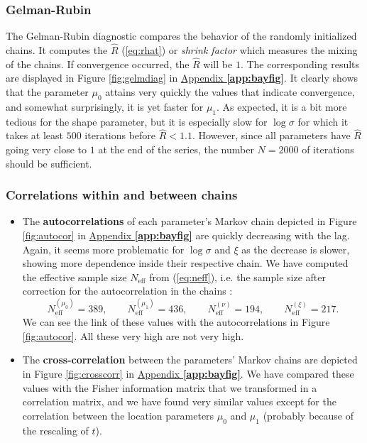 \subsubsection*{Gelman-Rubin}

The Gelman-Rubin diagnostic compares the behavior of the randomly initialized chains. It computes the $\hat{R}$ (\ref{eq:rhat}) or \emph{shrink factor} which measures the mixing of the chains. If convergence occurred, the $\hat{R}$ will be $1$.
The corresponding results are displayed in Figure \ref{fig:gelmdiag} in \hyperref[app:bayfig]{Appendix \textbf{\ref{app:bayfig}}}. It clearly shows that the parameter $\mu_0$ attains very quickly the values that indicate convergence, and somewhat surprisingly, it is yet faster for $\mu_1$.
As expected, it is a bit more tedious for the shape parameter, but it is especially slow for $\log\sigma$ for which it takes at least $500$ iterations before $\hat{R}<1.1$. However, since all parameters have $\hat{R}$ going very close to $1$ at the end of the series, the number $N=2000$ of iterations should be sufficient.



\subsubsection*{Correlations within and between chains}


\begin{itemize}
	\item The \textbf{autocorrelations} of each parameter's Markov chain depicted in Figure \ref{fig:autocor} in \hyperref[app:bayfig]{Appendix \textbf{\ref{app:bayfig}}} are quickly decreasing with the lag. Again, it seems more problematic for $\log\sigma$ and $\xi$ as the decrease is slower, showing more dependence inside their respective chain.	
	We have computed the effective sample size $N_{\text{eff}}$ from (\ref{eq:neff}), i.e. the sample size after correction for the autocorrelation in the chains :
	\begin{equation}
		N_{\text{eff}}^{(\mu_0)} = 389, \qquad 	N_{\text{eff}}^{(\mu_1)} = 436, \qquad 	N_{\text{eff}}^{(\nu)} = 194, \qquad	N_{\text{eff}}^{(\xi)} = 217.
	\end{equation}
	We can see the link of these values with the autocorrelations in Figure \ref{fig:autocor}. All these very high are not very high.
	
	\item The \textbf{cross-correlation} between the parameters' Markov chains are depicted in Figure \ref{fig:crosscorr} in \hyperref[app:bayfig]{Appendix \textbf{\ref{app:bayfig}}}. We have compared these values with the Fisher information matrix that we transformed in a correlation matrix, and we have found very similar values except for the correlation between the location parameters $\mu_0$ and $\mu_1$ (probably because of the rescaling of $t$).
\end{itemize}


